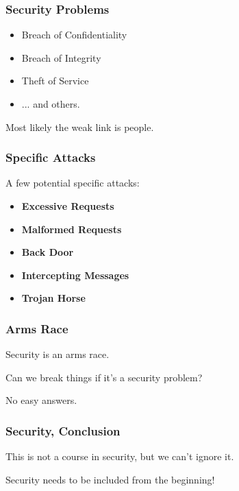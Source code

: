 \begin{frame}
\frametitle{Security Problems}

\begin{itemize}
	\item Breach of Confidentiality
	\item Breach of Integrity
	\item Theft of Service
	\item ... and others.
\end{itemize}

Most likely the weak link is people.

\end{frame}


\begin{frame}
\frametitle{Specific Attacks}
A few potential specific attacks:

\begin{itemize}
	\item \textbf{Excessive Requests}
	\item \textbf{Malformed Requests}
	\item \textbf{Back Door}
	\item \textbf{Intercepting Messages}
	\item \textbf{Trojan Horse}
\end{itemize}


\end{frame}


\begin{frame}
\frametitle{Arms Race}

Security is an arms race.

Can we break things if it's a security problem?

No easy answers.


\end{frame}


\begin{frame}
\frametitle{Security, Conclusion}

This is not a course in security, but we can't ignore it.

Security needs to be included from the beginning!


\end{frame}








